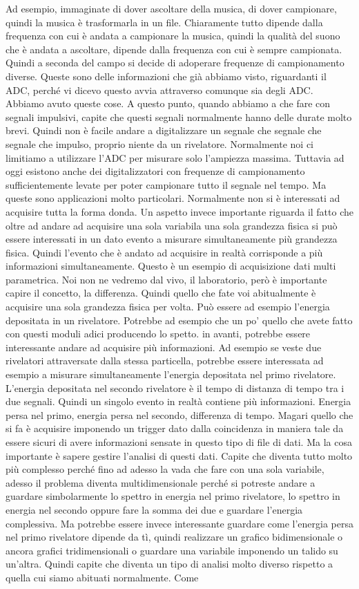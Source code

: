 {Ad esempio, immaginate di dover ascoltare della musica, di dover campionare, quindi la musica è trasformarla in un file. Chiaramente tutto dipende dalla frequenza con cui è andata a campionare la musica, quindi la qualità del suono che è andata a ascoltare, dipende dalla frequenza con cui è sempre campionata. Quindi a seconda del campo si decide di adoperare frequenze di campionamento diverse. Queste sono delle informazioni che già abbiamo visto, riguardanti il ADC, perché vi dicevo questo avvia attraverso comunque sia degli ADC. Abbiamo avuto queste cose. A questo punto, quando abbiamo a che fare con segnali impulsivi, capite che questi segnali normalmente hanno delle durate molto brevi. Quindi non è facile andare a digitalizzare un segnale che segnale che segnale che impulso, proprio niente da un rivelatore. Normalmente noi ci limitiamo a utilizzare l'ADC per misurare solo l'ampiezza massima. Tuttavia ad oggi esistono anche dei digitalizzatori con frequenze di campionamento sufficientemente levate per poter campionare tutto il segnale nel tempo. Ma queste sono applicazioni molto particolari. Normalmente non si è interessati ad acquisire tutta la forma donda. Un aspetto invece importante riguarda il fatto che oltre ad andare ad acquisire una sola variabila una sola grandezza fisica si può essere interessati in un dato evento a misurare simultaneamente più grandezza fisica. Quindi l'evento che è andato ad acquisire in realtà corrisponde a più informazioni simultaneamente. Questo è un esempio di acquisizione dati multi parametrica. Noi non ne vedremo dal vivo, il laboratorio, però è importante capire il concetto, la differenza. Quindi quello che fate voi abitualmente è acquisire una sola grandezza fisica per volta. Può essere ad esempio l'energia depositata in un rivelatore. Potrebbe ad esempio che un po' quello che avete fatto con questi moduli adici producendo lo spetto. in avanti, potrebbe essere interessante andare ad acquisire più informazioni. Ad esempio se veste due rivelatori attraversate dalla stessa particella, potrebbe essere interessata ad esempio a misurare simultaneamente l'energia depositata nel primo rivelatore. L'energia depositata nel secondo rivelatore è il tempo di distanza di tempo tra i due segnali. Quindi un singolo evento in realtà contiene più informazioni. Energia persa nel primo, energia persa nel secondo, differenza di tempo. Magari quello che si fa è acquisire imponendo un trigger dato dalla coincidenza in maniera tale da essere sicuri di avere informazioni sensate in questo tipo di file di dati. Ma la cosa importante è sapere gestire l'analisi di questi dati. Capite che diventa tutto molto più complesso perché fino ad adesso la vada che fare con una sola variabile, adesso il problema diventa multidimensionale perché si potreste andare a guardare simbolarmente lo spettro in energia nel primo rivelatore, lo spettro in energia nel secondo oppure fare la somma dei due e guardare l'energia complessiva. Ma potrebbe essere invece interessante guardare come l'energia persa nel primo rivelatore dipende da tì, quindi realizzare un grafico bidimensionale o ancora grafici tridimensionali o guardare una variabile imponendo un talido su un'altra. Quindi capite che diventa un tipo di analisi molto diverso rispetto a quella cui siamo abituati normalmente. Come }
